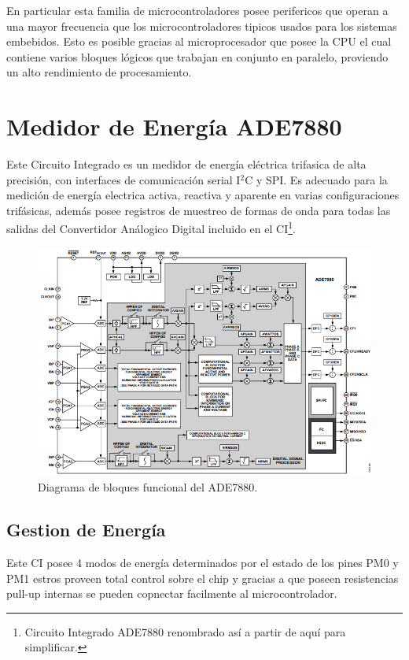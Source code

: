 \documentclass[letterpaper,12pt,oneside]{book}
\begin{document}
		En particular esta familia de microcontroladores posee perifericos que operan a una mayor frecuencia que los microcontroladores tipicos usados para los sistemas embebidos. Esto es posible gracias al microprocesador que posee la CPU el cual contiene varios bloques lógicos que trabajan en conjunto en paralelo, proviendo un alto rendimiento de procesamiento.

		\section{Medidor de Energía ADE7880}
		Este Circuito Integrado es un medidor de energía eléctrica trifasica de alta precisión, con interfaces de comunicación serial I$^2$C y SPI. Es adecuado para la medición de energía electrica activa, reactiva y aparente en varias configuraciones trifásicas, además posee registros de muestreo de formas de onda para todas las salidas del Convertidor Análogico Digital incluido en el CI\footnote{Circuito Integrado ADE7880 renombrado así a partir de aquí para simplificar.}.

		\begin{figure}[!htpb]
			\centering
			\includegraphics[scale = 0.8]{Material de Consulta/ADE7880FuncDiag.PNG}
			\caption[Diagrama de Bloques del ADE7880]{Diagrama de bloques funcional del ADE7880.}
			\label{FuncDiag}
		\end{figure}

			\subsection{Gestion de Energía}
			Este CI posee 4 modos de energía determinados por el estado de los pines PM0 y PM1 estros proveen total control sobre el chip y gracias a que poseen resistencias pull-up internas se pueden copnectar facilmente al microcontrolador.
\end{document}

